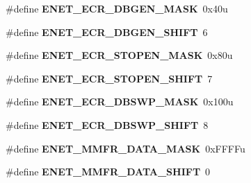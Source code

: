 \begin{DoxyCompactItemize}
\item 
\hypertarget{group___e_n_e_t___register___masks_ga0ac795d0ce9073caa7812af08d401bd2}{}\#define {\bfseries E\+N\+E\+T\+\_\+\+E\+C\+R\+\_\+\+D\+B\+G\+E\+N\+\_\+\+M\+A\+S\+K}~0x40u\label{group___e_n_e_t___register___masks_ga0ac795d0ce9073caa7812af08d401bd2}

\item 
\hypertarget{group___e_n_e_t___register___masks_gaf285ad3a1ec1a22c29463f3c5ce55629}{}\#define {\bfseries E\+N\+E\+T\+\_\+\+E\+C\+R\+\_\+\+D\+B\+G\+E\+N\+\_\+\+S\+H\+I\+F\+T}~6\label{group___e_n_e_t___register___masks_gaf285ad3a1ec1a22c29463f3c5ce55629}

\item 
\hypertarget{group___e_n_e_t___register___masks_ga94a800b28e1ec6fbf2e6a237abe50dc6}{}\#define {\bfseries E\+N\+E\+T\+\_\+\+E\+C\+R\+\_\+\+S\+T\+O\+P\+E\+N\+\_\+\+M\+A\+S\+K}~0x80u\label{group___e_n_e_t___register___masks_ga94a800b28e1ec6fbf2e6a237abe50dc6}

\item 
\hypertarget{group___e_n_e_t___register___masks_ga265342bcbd0f282f5fbd894bb7e5191c}{}\#define {\bfseries E\+N\+E\+T\+\_\+\+E\+C\+R\+\_\+\+S\+T\+O\+P\+E\+N\+\_\+\+S\+H\+I\+F\+T}~7\label{group___e_n_e_t___register___masks_ga265342bcbd0f282f5fbd894bb7e5191c}

\item 
\hypertarget{group___e_n_e_t___register___masks_ga1fccd5e705835e6e4232a4a73d66d151}{}\#define {\bfseries E\+N\+E\+T\+\_\+\+E\+C\+R\+\_\+\+D\+B\+S\+W\+P\+\_\+\+M\+A\+S\+K}~0x100u\label{group___e_n_e_t___register___masks_ga1fccd5e705835e6e4232a4a73d66d151}

\item 
\hypertarget{group___e_n_e_t___register___masks_ga62f057092940bf8385c24171c4414f76}{}\#define {\bfseries E\+N\+E\+T\+\_\+\+E\+C\+R\+\_\+\+D\+B\+S\+W\+P\+\_\+\+S\+H\+I\+F\+T}~8\label{group___e_n_e_t___register___masks_ga62f057092940bf8385c24171c4414f76}

\item 
\hypertarget{group___e_n_e_t___register___masks_ga9059e7e576983c3c51723ee135d4e244}{}\#define {\bfseries E\+N\+E\+T\+\_\+\+M\+M\+F\+R\+\_\+\+D\+A\+T\+A\+\_\+\+M\+A\+S\+K}~0x\+F\+F\+F\+Fu\label{group___e_n_e_t___register___masks_ga9059e7e576983c3c51723ee135d4e244}

\item 
\hypertarget{group___e_n_e_t___register___masks_gaa6293f53a8dbb48f6ae13d9ea7717293}{}\#define {\bfseries E\+N\+E\+T\+\_\+\+M\+M\+F\+R\+\_\+\+D\+A\+T\+A\+\_\+\+S\+H\+I\+F\+T}~0\label{group___e_n_e_t___register___masks_gaa6293f53a8dbb48f6ae13d9ea7717293}


\end{DoxyCompactItemize}
